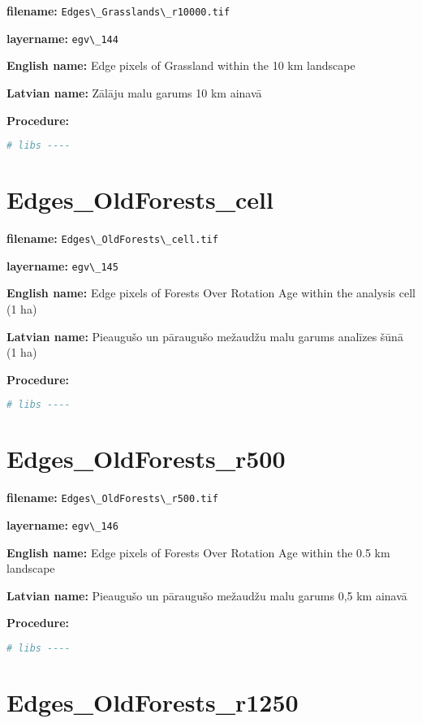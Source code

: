 \documentclass[
]{book}
\newcommand{\passthrough}[1]{#1}
\begin{document}
\textbf{filename:} \passthrough{\lstinline!Edges\_Grasslands\_r10000.tif!}

\textbf{layername:} \passthrough{\lstinline!egv\_144!}

\textbf{English name:} Edge pixels of Grassland within the 10 km landscape

\textbf{Latvian name:} Zālāju malu garums 10 km ainavā

\textbf{Procedure:}

\begin{lstlisting}[language=R]
# libs ----
\end{lstlisting}

\section{Edges\_OldForests\_cell}\label{ch06.145}

\textbf{filename:} \passthrough{\lstinline!Edges\_OldForests\_cell.tif!}

\textbf{layername:} \passthrough{\lstinline!egv\_145!}

\textbf{English name:} Edge pixels of Forests Over Rotation Age within the analysis cell (1 ha)

\textbf{Latvian name:} Pieaugušo un pāraugušo mežaudžu malu garums analīzes šūnā (1 ha)

\textbf{Procedure:}

\begin{lstlisting}[language=R]
# libs ----
\end{lstlisting}

\section{Edges\_OldForests\_r500}\label{ch06.146}

\textbf{filename:} \passthrough{\lstinline!Edges\_OldForests\_r500.tif!}

\textbf{layername:} \passthrough{\lstinline!egv\_146!}

\textbf{English name:} Edge pixels of Forests Over Rotation Age within the 0.5 km landscape

\textbf{Latvian name:} Pieaugušo un pāraugušo mežaudžu malu garums 0,5 km ainavā

\textbf{Procedure:}

\begin{lstlisting}[language=R]
# libs ----
\end{lstlisting}

\section{Edges\_OldForests\_r1250}\label{ch06.147}
\end{document}
